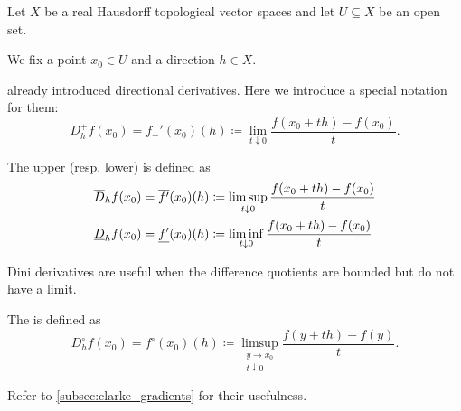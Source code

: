 \begin{definition}\label{def:nonsmooth_derivatives}
  Let \( X \) be a real Hausdorff topological vector spaces and let \( U \subseteq X \) be an open set.

  We fix a point \( x_0 \in U \) and a direction \( h \in X \).

  \begin{defenum}
     already introduced directional derivatives. Here we introduce a special notation for them:
    \begin{equation*}
      D_h^+ f(x_0) = f_+'(x_0)(h) \coloneqq \lim_{t \downarrow 0} \frac {f(x_0 + th) - f(x_0)} t.
    \end{equation*}

    \cite[definition 11.18]{Clarke2013} The upper (resp. lower)  is defined as
    \begin{align*}
      \overline{D}_h f(x_0) = \overline{f'}(x_0)(h) &\coloneqq \limsup_{t \downarrow 0} \frac {f(x_0 + th) - f(x_0)} t
      \\
      \underline{D}_h f(x_0) = \underline{f'}(x_0)(h) &\coloneqq \liminf_{t \downarrow 0} \frac {f(x_0 + th) - f(x_0)} t
    \end{align*}

    Dini derivatives are useful when the difference quotients are bounded but do not have a limit.

    \cite[section 10.1]{Clarke2013} The  is defined as
    \begin{equation*}
      D_h^\circ f(x_0)
      =
      f^\circ(x_0)(h)
      \coloneqq
      \limsup_{\substack{y \to x_0 \\ t \downarrow 0}} \frac {f(y + th) - f(y)} t.
    \end{equation*}

    Refer to \cref{subsec:clarke_gradients} for their usefulness.
  \end{defenum}
\end{definition}
